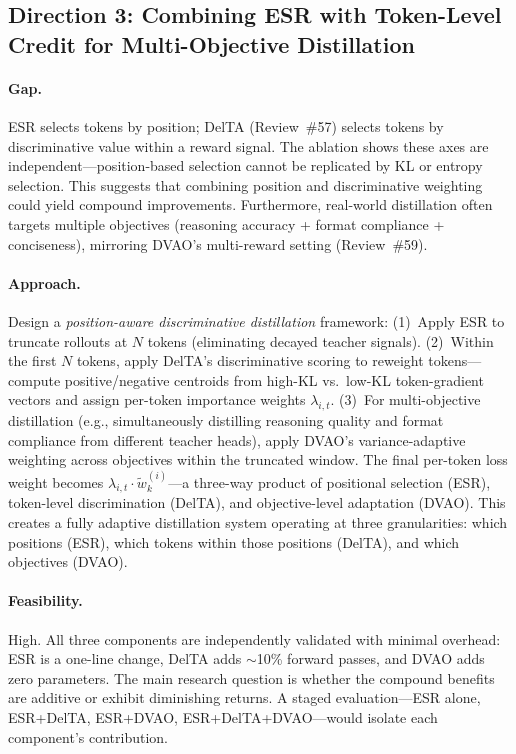 \documentclass[11pt,a4paper]{article}
\begin{document}
\subsection*{Direction 3: Combining ESR with Token-Level Credit for Multi-Objective Distillation}

\paragraph{Gap.}
ESR selects tokens by position; DelTA (Review~\#57) selects tokens by discriminative value within a reward signal. The ablation shows these axes are independent---position-based selection cannot be replicated by KL or entropy selection. This suggests that combining position and discriminative weighting could yield compound improvements. Furthermore, real-world distillation often targets multiple objectives (reasoning accuracy + format compliance + conciseness), mirroring DVAO's multi-reward setting (Review~\#59).

\paragraph{Approach.}
Design a \emph{position-aware discriminative distillation} framework: (1)~Apply ESR to truncate rollouts at $N$ tokens (eliminating decayed teacher signals). (2)~Within the first $N$ tokens, apply DelTA's discriminative scoring to reweight tokens---compute positive/negative centroids from high-KL vs.\ low-KL token-gradient vectors and assign per-token importance weights $\lambda_{i,t}$. (3)~For multi-objective distillation (e.g., simultaneously distilling reasoning quality and format compliance from different teacher heads), apply DVAO's variance-adaptive weighting across objectives within the truncated window. The final per-token loss weight becomes $\lambda_{i,t} \cdot \tilde{w}_k^{(i)}$---a three-way product of positional selection (ESR), token-level discrimination (DelTA), and objective-level adaptation (DVAO). This creates a fully adaptive distillation system operating at three granularities: which positions (ESR), which tokens within those positions (DelTA), and which objectives (DVAO).

\paragraph{Feasibility.}
High. All three components are independently validated with minimal overhead: ESR is a one-line change, DelTA adds $\sim$10\% forward passes, and DVAO adds zero parameters. The main research question is whether the compound benefits are additive or exhibit diminishing returns. A staged evaluation---ESR alone, ESR+DelTA, ESR+DVAO, ESR+DelTA+DVAO---would isolate each component's contribution.
\end{document}
